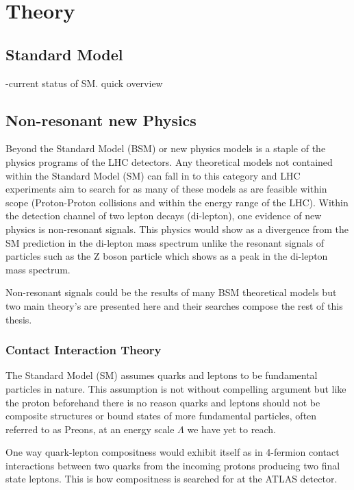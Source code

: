 \chapter{Theory}

\section{Standard Model}
-current status of SM. quick overview

\section{Non-resonant new Physics}

Beyond the Standard Model (BSM) or new physics models is a staple of the physics programs of the LHC detectors. Any theoretical models not contained within the Standard Model (SM) can fall in to this category and LHC experiments aim to search for as many of these models as are feasible within scope (Proton-Proton collisions and within the energy range of the LHC). Within the detection channel of two lepton decays (di-lepton), one evidence of new physics is non-resonant signals. This physics would show as a divergence from the SM prediction in the di-lepton mass spectrum unlike the resonant signals of particles such as the Z boson particle which shows as a peak in the di-lepton mass spectrum.

Non-resonant signals could be the results of many BSM theoretical models but two main theory’s are presented here and their searches compose the rest of this thesis.


\subsection{Contact Interaction Theory}

The Standard Model (SM) assumes quarks and leptons to be fundamental particles in nature. This assumption is not without compelling argument but like the proton beforehand there is no reason quarks and leptons should not be composite structures or bound states of more fundamental particles, often referred to as Preons\cite{new_tests}, at an energy scale $\Lambda$ we have yet to reach. 

One way quark-lepton compositness would exhibit itself as in 4-fermion contact interactions between two quarks from the incoming protons producing two final state leptons. This is how compositness is searched for at the ATLAS detector.

